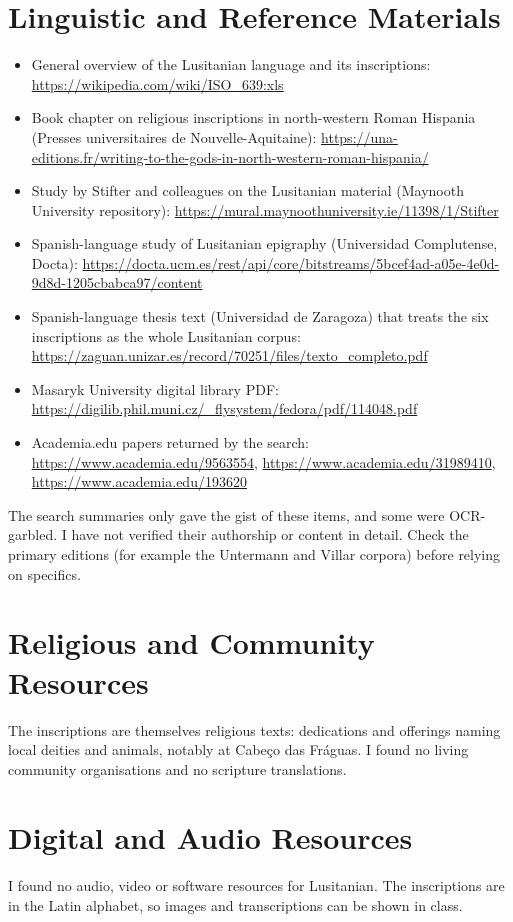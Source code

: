 \documentclass[12pt]{article}
\begin{document}
\section{Linguistic and Reference Materials}
\begin{itemize}
\item General overview of the Lusitanian language and its inscriptions: \url{https://wikipedia.com/wiki/ISO_639:xls}
\item Book chapter on religious inscriptions in north-western Roman Hispania (Presses universitaires de Nouvelle-Aquitaine): \url{https://una-editions.fr/writing-to-the-gods-in-north-western-roman-hispania/}
\item Study by Stifter and colleagues on the Lusitanian material (Maynooth University repository): \url{https://mural.maynoothuniversity.ie/11398/1/Stifter}
\item Spanish-language study of Lusitanian epigraphy (Universidad Complutense, Docta): \url{https://docta.ucm.es/rest/api/core/bitstreams/5bcef4ad-a05e-4e0d-9d8d-1205cbabca97/content}
\item Spanish-language thesis text (Universidad de Zaragoza) that treats the six inscriptions as the whole Lusitanian corpus: \url{https://zaguan.unizar.es/record/70251/files/texto_completo.pdf}
\item Masaryk University digital library PDF: \url{https://digilib.phil.muni.cz/_flysystem/fedora/pdf/114048.pdf}
\item Academia.edu papers returned by the search: \url{https://www.academia.edu/9563554}, \url{https://www.academia.edu/31989410}, \url{https://www.academia.edu/193620}
\end{itemize}
The search summaries only gave the gist of these items, and some were OCR-garbled. I have not verified their authorship or content in detail. Check the primary editions (for example the Untermann and Villar corpora) before relying on specifics.

\section{Religious and Community Resources}
The inscriptions are themselves religious texts: dedications and offerings naming local deities and animals, notably at Cabeço das Fráguas. I found no living community organisations and no scripture translations.

\section{Digital and Audio Resources}
I found no audio, video or software resources for Lusitanian. The inscriptions are in the Latin alphabet, so images and transcriptions can be shown in class.
\end{document}
